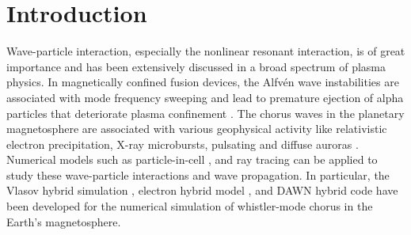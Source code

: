 \section{Introduction}
Wave-particle interaction, especially the nonlinear resonant interaction, is of great importance and has been extensively discussed in a broad spectrum of plasma physics. 
In magnetically confined fusion devices, the Alfv\'en wave instabilities 
are associated with mode frequency sweeping 
\cite{chen2016,wang2018,wang2012,wang2012a} 
and lead to premature ejection of alpha particles that deteriorate plasma confinement \cite{fasoli2007}.
The chorus waves  
in the planetary magnetosphere \cite{tsurutani1974} 
are associated with various geophysical activity like relativistic electron precipitation, X-ray microbursts, pulsating and diffuse auroras \cite{kasahara2018,reeves2013,thorne2013}.
Numerical models such as 
particle-in-cell \cite{chen2015a,xiao2013variational,xiao2020explicit}, and ray tracing \cite{xie2022} can be applied to study these wave-particle interactions and wave propagation. 
In particular, the Vlasov  hybrid simulation  \cite{vhscode},
electron hybrid model \cite{katoh2016}, and DAWN hybrid code \cite{tao2014a} 
have been developed for the numerical simulation of whistler-mode chorus in the Earth's magnetosphere.  

